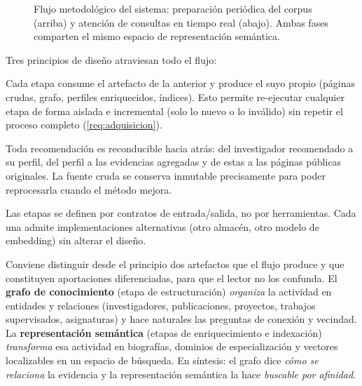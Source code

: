 \begin{figure}[htbp]
{
    }
    \caption[Flujo metodológico del sistema]{Flujo metodológico del sistema: preparación periódica del corpus (arriba) y atención de consultas en tiempo real (abajo).
    Ambas fases comparten el mismo espacio de representación semántica.}
    \label{fig:flujo}
\end{figure}

Tres principios de diseño atraviesan todo el flujo:

\begin{mydescription}
    \item[Etapas con artefactos persistentes.] Cada etapa consume el artefacto de la anterior y produce el suyo propio (páginas crudas, grafo, perfiles enriquecidos, índices).
    Esto permite re-ejecutar cualquier etapa de forma aislada e incremental (solo lo nuevo o lo inválido) sin repetir el proceso completo (\ref{req:adquisicion}).
    \item[Trazabilidad.] Toda recomendación es reconducible hacia atrás: del investigador recomendado a su perfil, del perfil a las evidencias agregadas y de estas a las páginas públicas originales.
    La fuente cruda se conserva inmutable precisamente para poder reprocesarla cuando el método mejora.
    \item[Neutralidad tecnológica.] Las etapas se definen por contratos de entrada/salida, no por herramientas. Cada una admite implementaciones alternativas (otro almacén, otro modelo de embedding) sin alterar el diseño.
\end{mydescription}

Conviene distinguir desde el principio dos artefactos que el flujo produce y que constituyen aportaciones diferenciadas, para que el lector no los confunda.
El \textbf{grafo de conocimiento} (etapa de estructuración) \emph{organiza} la actividad en entidades y relaciones (investigadores, publicaciones, proyectos, trabajos supervisados, asignaturas) y hace naturales las preguntas de conexión y vecindad.
La \textbf{representación semántica} (etapas de enriquecimiento e indexación) \emph{transforma} esa actividad en biografías, dominios de especialización y vectores localizables en un espacio de búsqueda.
En síntesis: el grafo dice \emph{cómo se relaciona} la evidencia y la representación semántica la hace \emph{buscable por afinidad}.


